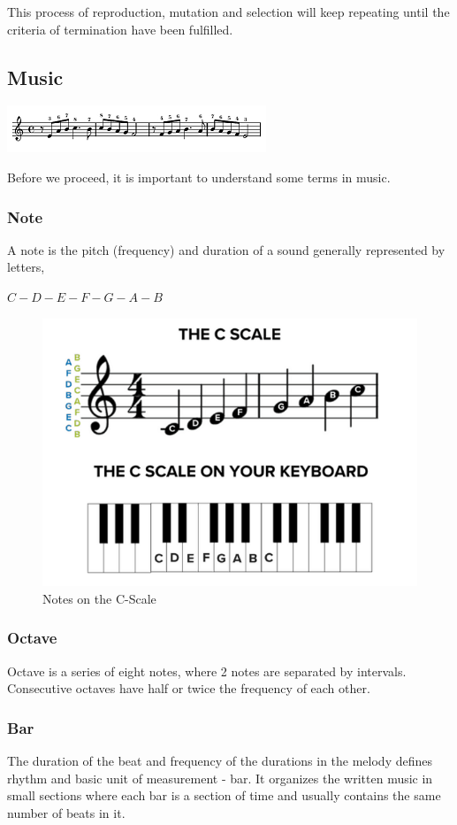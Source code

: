 \documentclass[conference]{IEEEtran}
\begin{document}
This process of reproduction, mutation and selection will keep repeating until the criteria of termination have been fulfilled.

\subsection{Music}
\includegraphics{music.png}

Before we proceed, it is important to understand some terms in music.

\subsubsection{Note}
A note is the pitch (frequency) and duration of a sound generally represented by letters,
\begin{center}
    $C-D-E-F-G-A-B$
\end{center}
\begin{figure}
\includegraphics[width=7 cm, height=7 cm]{notes.png}
\caption{Notes on the C-Scale \cite{b4}}
\end{figure}

\subsubsection{Octave}
Octave is a series of eight notes, where 2 notes are separated by intervals. Consecutive octaves have half or twice the frequency of each other.

\subsubsection{Bar}
The duration of the beat and frequency of the durations in the melody defines rhythm and basic unit of measurement - bar. It organizes the written music in small sections where each bar is a section of time and usually contains the same number of beats in it.
\end{document}
